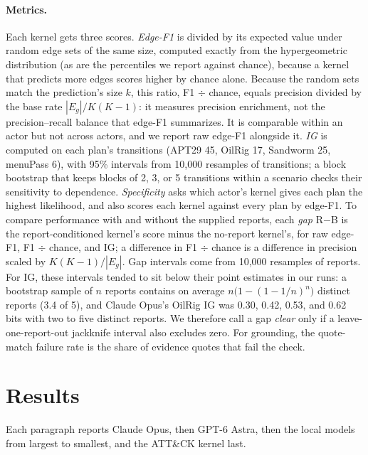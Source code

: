 \documentclass[letterpaper]{article}
\begin{document}
\paragraph{Metrics.} Each kernel gets three scores. \emph{Edge-F1} is divided by its expected value under random edge sets of the same size, computed exactly from the hypergeometric distribution (as are the percentiles we report against chance), because a kernel that predicts more edges scores higher by chance alone. Because the random sets match the prediction's size $k$, this ratio, F1 $\div$ chance, equals precision divided by the base rate $|E_g|/K(K-1)$: it measures precision enrichment, not the precision--recall balance that edge-F1 summarizes. It is comparable within an actor but not across actors, and we report raw edge-F1 alongside it. \emph{IG} is computed on each plan's transitions (APT29 45, OilRig 17, Sandworm 25, menuPass 6), with 95\% intervals from 10{,}000 resamples of transitions; a block bootstrap that keeps blocks of 2, 3, or 5 transitions within a scenario checks their sensitivity to dependence. \emph{Specificity} asks which actor's kernel gives each plan the highest likelihood, and also scores each kernel against every plan by edge-F1. To compare performance with and without the supplied reports, each \emph{gap} R$-$B is the report-conditioned kernel's score minus the no-report kernel's, for raw edge-F1, F1 $\div$ chance, and IG; a difference in F1 $\div$ chance is a difference in precision scaled by $K(K-1)/|E_g|$. Gap intervals come from 10{,}000 resamples of reports. For IG, these intervals tended to sit below their point estimates in our runs: a bootstrap sample of $n$ reports contains on average $n\bigl(1-(1-1/n)^n\bigr)$ distinct reports (3.4 of 5), and Claude Opus's OilRig IG was 0.30, 0.42, 0.53, and 0.62 bits with two to five distinct reports. We therefore call a gap \emph{clear} only if a leave-one-report-out jackknife interval also excludes zero. For grounding, the quote-match failure rate is the share of evidence quotes that fail the check.
\section{Results}

Each paragraph reports Claude Opus, then GPT-6 Astra, then the local models from largest to smallest, and the ATT\&CK kernel last.


\end{document}
